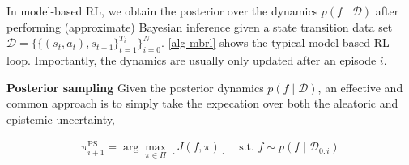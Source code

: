 \documentclass{article}
\newcommand{\dataset}{\ensuremath{\mathcal{D}}}
\newcommand{\inputDomain}{\ensuremath{\mathbb{R}^{D}}}
\newcommand{\outputDomain}{\ensuremath{\mathbb{R}^{C}}}
\newcommand{\policyDomain}{\ensuremath{\Pi}}
\newcommand{\transitionFn}{\ensuremath{f}}
\newcommand{\weights}{\ensuremath{\mathbf{w}}}
\newcommand{\transitionFnWithParams}{\ensuremath{\transitionFn_{\weights}}}
\newcommand{\policy}{\ensuremath{\pi}}
\begin{document}
In model-based RL, we obtain the posterior over the dynamics \(p(f\mid\mathcal{D})\) after performing (approximate) Bayesian
inference given a state transition data set \(\mathcal{D} = \{\{(s_{t},a_{t}), s_{t+1}\}^{T_{i}}_{t=1}\}_{i=0}^{N}\).
\cref{alg-mbrl} shows the typical model-based RL loop.
Importantly, the dynamics are usually only updated after an episode $i$.


\textbf{Posterior sampling}
Given the posterior dynamics \(p(\transitionFn \mid \mathcal{D})\),
an effective and  common approach is to simply take the expecation over both the aleatoric and epistemic uncertainty,

\cite{osbandWhyPosteriorSampling2017,osbandMoreEfficientReinforcement2013}
\begin{align} \label{eq-posterior-sampling}
\policy_{i+1}^{\text{PS}} = \arg \max_{\policy \in \policyDomain} \left[ J(\transitionFn, \policy) \right] \quad \text{s.t. } \transitionFn \sim p(\transitionFn \mid \dataset_{0:i})
\end{align}






\end{document}
